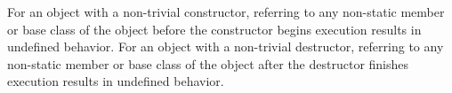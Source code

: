 \pnum
{}%
%
For an object with a non-trivial constructor, referring to any non-static member
or base class of the object before the constructor begins execution results in
undefined behavior.
%
%
%
%
%
For an object with a non-trivial destructor, referring to
any non-static member or base class of the object after the destructor finishes
execution results in undefined behavior.
%
%
%
%
%
